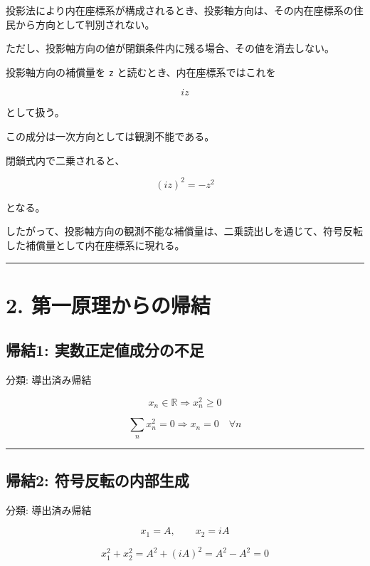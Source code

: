 \documentclass[
  a4paper,
]{ltjsarticle}
\begin{document}
投影法により内在座標系が構成されるとき、投影軸方向は、その内在座標系の住民から方向として判別されない。

ただし、投影軸方向の値が閉鎖条件内に残る場合、その値を消去しない。

投影軸方向の補償量を \texttt{z} と読むとき、内在座標系ではこれを

\[
iz
\]

として扱う。

この成分は一次方向としては観測不能である。

閉鎖式内で二乗されると、

\[
(iz)^2=-z^2
\]

となる。

したがって、投影軸方向の観測不能な補償量は、二乗読出しを通じて、符号反転した補償量として内在座標系に現れる。

\begin{center}\rule{0.5\linewidth}{0.5pt}\end{center}

\section{2.
第一原理からの帰結}\label{ux7b2cux4e00ux539fux7406ux304bux3089ux306eux5e30ux7d50}

\subsection{帰結1:
実数正定値成分の不足}\label{ux5e30ux7d501-ux5b9fux6570ux6b63ux5b9aux5024ux6210ux5206ux306eux4e0dux8db3}

分類: 導出済み帰結

\[
x_n\in\mathbb{R}
\Rightarrow
x_n^2\ge0
\]

\[
\sum_n x_n^2=0
\Rightarrow
x_n=0\quad\forall n
\]

\begin{center}\rule{0.5\linewidth}{0.5pt}\end{center}

\subsection{帰結2:
符号反転の内部生成}\label{ux5e30ux7d502-ux7b26ux53f7ux53cdux8ee2ux306eux5185ux90e8ux751fux6210}

分類: 導出済み帰結

\[
x_1=A,\qquad x_2=iA
\]

\[
x_1^2+x_2^2=A^2+(iA)^2=A^2-A^2=0
\]
\end{document}
